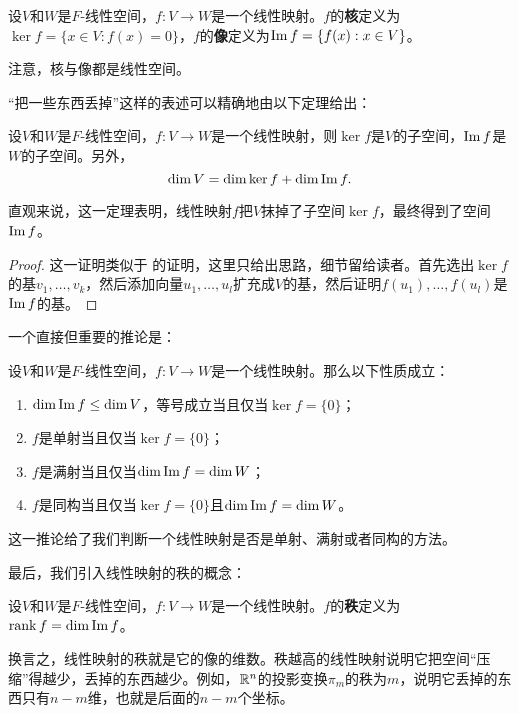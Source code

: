 \begin{definition}[核与像]\label{def:kernel-image}
设$V$和$W$是$F$-线性空间，$f:V\to W$是一个线性映射。$f$的\textbf{核}定义为$\ker f=\{x\in V:f(x)=0\}$，$f$的\textbf{像}定义为$\operatorname*{Im} f=\{f(x):x\in V\}$。
\end{definition}
注意，核与像都是线性空间。

“把一些东西丢掉”这样的表述可以精确地由以下定理给出：

\begin{theorem}\label{thm:kernel-image-property}
设$V$和$W$是$F$-线性空间，$f:V\to W$是一个线性映射，则$\ker f$是$V$的子空间，$\operatorname*{Im} f$是$W$的子空间。另外，
\[\dim V=\dim\ker f+\dim\operatorname*{Im} f.\]
\end{theorem}
直观来说，这一定理表明，线性映射$f$把$V$抹掉了子空间$\ker f$，最终得到了空间$\operatorname*{Im} f$。
\begin{proof}
这一证明类似于 的证明，这里只给出思路，细节留给读者。首先选出$\ker f$的基$v_1,\dots,v_k$，然后添加向量$u_1,\dots,u_l$扩充成$V$的基，然后证明$f(u_1),\dots,f(u_l)$是$\operatorname*{Im} f$的基。
\end{proof}

一个直接但重要的推论是：
\begin{corollary}\label{cor:kernel-image-isomorphism}
设$V$和$W$是$F$-线性空间，$f:V\to W$是一个线性映射。那么以下性质成立：
\begin{enumerate}
    \item $\dim \operatorname*{Im} f\leq \dim V$，等号成立当且仅当$\ker f=\{0\}$；
    \item $f$是单射当且仅当$\ker f=\{0\}$；
    \item $f$是满射当且仅当$\dim \operatorname*{Im} f=\dim W$；
    \item $f$是同构当且仅当$\ker f=\{0\}$且$\dim \operatorname*{Im} f=\dim W$。
\end{enumerate}
\end{corollary}
这一推论给了我们判断一个线性映射是否是单射、满射或者同构的方法。

最后，我们引入线性映射的秩的概念：
\begin{definition}[线性映射的秩]
设$V$和$W$是$F$-线性空间，$f:V\to W$是一个线性映射。$f$的\textbf{秩}定义为$\operatorname*{rank} f=\dim\operatorname*{Im} f$。
\end{definition}
换言之，线性映射的秩就是它的像的维数。秩越高的线性映射说明它把空间“压缩”得越少，丢掉的东西越少。例如，$\mathbb{R}^n$的投影变换$\pi_m$的秩为$m$，说明它丢掉的东西只有$n-m$维，也就是后面的$n-m$个坐标。

